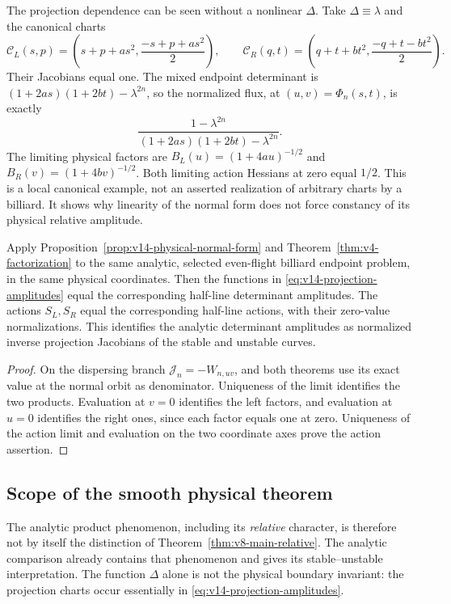 \begin{remark}
The projection dependence can be seen without a nonlinear $\Delta$.
Take $\Delta\equiv\lambda$ and the canonical charts
\[
 \mathcal C_L(s,p)=
  \left(s+p+as^2,\frac{-s+p+as^2}{2}\right),\qquad
 \mathcal C_R(q,t)=
  \left(q+t+bt^2,\frac{-q+t-bt^2}{2}\right).
\]
Their Jacobians equal one. The mixed endpoint determinant is
$(1+2as)(1+2bt)-\lambda^{2n}$, so the normalized flux, at
$(u,v)=\Phi_n(s,t)$, is exactly
\[
 \frac{1-\lambda^{2n}}
               {(1+2as)(1+2bt)-\lambda^{2n}}.
\]
The limiting physical factors are
$B_L(u)=(1+4au)^{-1/2}$ and $B_R(v)=(1+4bv)^{-1/2}$.
Both limiting action Hessians at zero equal $1/2$. This is a local
canonical example, not an asserted realization of arbitrary charts by
a billiard. It shows why linearity of the normal form does not force
constancy of its physical relative amplitude.
\end{remark}

\begin{corollary}
\label{cor:v14-amplitude-identification}
Apply Proposition~\ref{prop:v14-physical-normal-form} and
Theorem~\ref{thm:v4-factorization} to the same analytic, selected
even-flight billiard endpoint problem, in the same physical coordinates.
Then the functions in \eqref{eq:v14-projection-amplitudes} equal the
corresponding half-line determinant amplitudes. The actions $S_L,S_R$
equal the corresponding half-line actions, with their zero-value
normalizations. This identifies the analytic determinant amplitudes
as normalized inverse projection Jacobians of the stable and unstable
curves.
\end{corollary}
\begin{proof}
On the dispersing branch $\mathcal J_n=-W_{n,uv}$, and both theorems
use its exact value at the normal orbit as denominator. Uniqueness of
the limit identifies the two products. Evaluation at $v=0$ identifies
the left factors, and evaluation at $u=0$ identifies the right ones,
since each factor equals one at zero. Uniqueness of the action limit
and evaluation on the two coordinate axes prove the action assertion.
\end{proof}

\subsection{Scope of the smooth physical theorem}
The analytic product phenomenon, including its \emph{relative}
character, is therefore not by itself the distinction of
Theorem~\ref{thm:v8-main-relative}. The analytic comparison already
contains that phenomenon and gives its stable--unstable interpretation.
The function $\Delta$ alone is not the physical boundary invariant:
the projection charts occur essentially in
\eqref{eq:v14-projection-amplitudes}.

